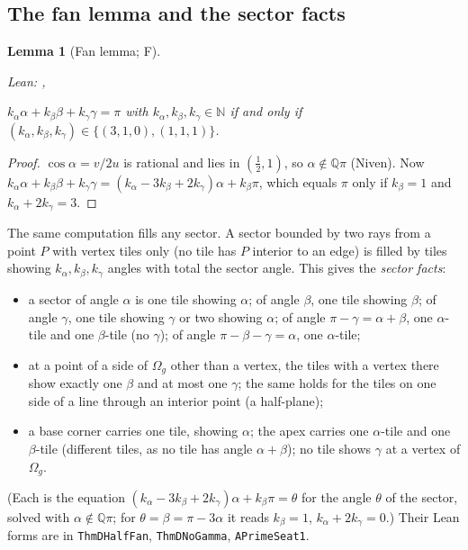 \documentclass[11pt,reqno]{amsart}
\theoremstyle{plain}
\newtheorem{lemma}[theorem]{Lemma}
\theoremstyle{definition}
\newcommand{\Q}{\mathbb{Q}}
\newcommand{\N}{\mathbb{N}}
\newcommand{\sF}{\textup{\textsf{F}}}
\begin{document}
\subsection{The fan lemma and the sector facts}\label{sub:fan}
\begin{lemma}[Fan lemma; \sF]\label{lem:fan}
{\small\noindent\emph{Lean:} , \par}
$k_\alpha\alpha+k_\beta\beta+k_\gamma\gamma=\pi$ with $k_\alpha,k_\beta,k_\gamma\in\N$ if and only if $(k_\alpha,k_\beta,k_\gamma)\in\{(3,1,0),(1,1,1)\}$.
\end{lemma}
\begin{proof}
$\cos\alpha=v/2u$ is rational and lies in $(\tfrac12,1)$, so $\alpha\notin\Q\pi$ (Niven). Now
$k_\alpha\alpha+k_\beta\beta+k_\gamma\gamma=(k_\alpha-3k_\beta+2k_\gamma)\alpha+k_\beta\pi$, which equals $\pi$ only if $k_\beta=1$ and $k_\alpha+2k_\gamma=3$.
\end{proof}
The same computation fills any sector. A sector bounded by two rays from a point $P$ with vertex tiles only (no tile has $P$ interior to an edge) is filled by tiles showing $k_\alpha,k_\beta,k_\gamma$ angles with total the sector angle. This gives the \emph{sector facts}:
\begin{itemize}
\item[\textup{(SF1)}] a sector of angle $\alpha$ is one tile showing $\alpha$; of angle $\beta$, one tile showing $\beta$; of angle $\gamma$, one tile showing $\gamma$ or two showing $\alpha$; of angle $\pi-\gamma=\alpha+\beta$, one $\alpha$-tile and one $\beta$-tile (no $\gamma$); of angle $\pi-\beta-\gamma=\alpha$, one $\alpha$-tile;
\item[\textup{(SF2)}] at a point of a side of $\Omega_{g}$ other than a vertex, the tiles with a vertex there show exactly one $\beta$ and at most one $\gamma$; the same holds for the tiles on one side of a line through an interior point (a half-plane);
\item[\textup{(SF3)}] a base corner carries one tile, showing $\alpha$; the apex carries one $\alpha$-tile and one $\beta$-tile (different tiles, as no tile has angle $\alpha+\beta$); no tile shows $\gamma$ at a vertex of $\Omega_{g}$.
\end{itemize}
(Each is the equation $(k_\alpha-3k_\beta+2k_\gamma)\alpha+k_\beta\pi=\theta$ for the angle $\theta$ of the sector, solved with $\alpha\notin\Q\pi$; for $\theta=\beta=\pi-3\alpha$ it reads $k_\beta=1$, $k_\alpha+2k_\gamma=0$.) Their Lean forms are in \texttt{ThmDHalfFan}, \texttt{ThmDNoGamma}, \texttt{APrimeSeat1}.
\end{document}
